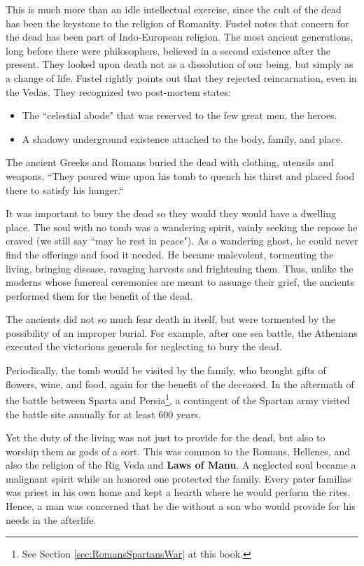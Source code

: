 This is much more than an idle intellectual exercise, since the cult of the dead has been the keystone to the religion of Romanity. Fustel notes that concern for the dead has been part of Indo-European religion. The most ancient generations, long before there were philosophers, believed in a second existence after the present. They looked upon death not as a dissolution of our being, but simply as a change of life. Fustel rightly points out that they rejected reincarnation, even in the Vedas. They recognized two post-mortem states:

\begin{itemize}
\item The ``celestial abode" that was reserved to the few great men, the heroes. 
\item A shadowy underground existence attached to the body, family, and place. 
\end{itemize}
The ancient Greeks and Romans buried the dead with clothing, utensils and weapons. ``They poured wine upon his tomb to quench his thirst and placed food there to satisfy his hunger.``

It was important to bury the dead so they would they would have a dwelling place. The soul with no tomb was a wandering spirit, vainly seeking the repose he craved (we still say ``may he rest in peace"). As a wandering ghost, he could never find the offerings and food it needed. He became malevolent, tormenting the living, bringing disease, ravaging harvests and frightening them. Thus, unlike the moderns whose funereal ceremonies are meant to assuage their grief, the ancients performed them for the benefit of the dead.

The ancients did not so much fear death in itself, but were tormented by the possibility of an improper burial. For example, after one sea battle, the Athenians executed the victorious generals for neglecting to bury the dead.

Periodically, the tomb would be visited by the family, who brought gifts of flowers, wine, and food, again for the benefit of the deceased. In the aftermath of the battle between Sparta and Persia\footnote{See Section \ref{sec:RomansSpartansWar} at this book.}, a contingent of the Spartan army visited the battle site annually for at least 600 years.

Yet the duty of the living was not just to provide for the dead, but also to worship them as gods of a sort. This was common to the Romans, Hellenes, and also the religion of the Rig Veda and \textbf{Laws of Manu}. A neglected soul became a malignant spirit while an honored one protected the family. Every pater familias was priest in his own home and kept a hearth where he would perform the rites. Hence, a man was concerned that he die without a son who would provide for his needs in the afterlife.

